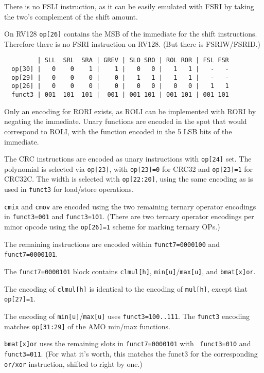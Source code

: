 There is no FSLI instruction, as it can be easily emulated with FSRI by taking the
two's complement of the shift amount.

On RV128 {\tt op[26]} contains the MSB of the immediate for the shift instructions.
Therefore there is no FSRI instruction on RV128. (But there is FSRIW/FSRID.)

\begin{minipage}{\linewidth}
\begin{verbatim}
         | SLL  SRL  SRA | GREV | SLO SRO | ROL ROR | FSL FSR
  op[30] |   0    0    1 |    1 |   0   0 |   1   1 |   -   -
  op[29] |   0    0    0 |    0 |   1   1 |   1   1 |   -   -
  op[26] |   0    0    0 |    0 |   0   0 |   0   0 |   1   1
  funct3 | 001  101  101 |  001 | 001 101 | 001 101 | 001 101
\end{verbatim}
\end{minipage}

Only an encoding for RORI exists, as ROLI can be implemented with RORI by negating
the immediate. Unary functions are encoded in the spot that would correspond to ROLI,
with the function encoded in the 5 LSB bits of the immediate.

The CRC instructions are encoded as unary instructions with {\tt op[24]} set. The
polynomial is selected via {\tt op[23]}, with {\tt op[23]=0} for CRC32 and
{\tt op[23]=1} for CRC32C. The width is selected with {\tt op[22:20]}, using
the same encoding as is used in {\tt funct3} for load/store operations.

{\tt cmix} and {\tt cmov} are encoded using the two remaining ternary operator
encodings in {\tt funct3=001} and {\tt funct3=101}. (There are two ternary
operator encodings per minor opcode using the {\tt op[26]=1} scheme for
marking ternary OPs.)

The remaining instructions are encoded within {\tt funct7=0000100} and
{\tt funct7=0000101}.

The {\tt funct7=0000101} block contains {\tt clmul[h]},
{\tt min[u]}/{\tt max[u]}, and {\tt bmat[x]or}.

The encoding of {\tt clmul[h]} is identical to the encoding of {\tt mul[h]},
except that {\tt op[27]=1}.

The encoding of {\tt min[u]}/{\tt max[u]} uses {\tt funct3=100..111}. The
{\tt funct3} encoding matches {\tt op[31:29]} of the AMO min/max functions.

{\tt bmat[x]or} uses the remaining slots in {\tt funct7=0000101} with {\tt
funct3=010} and {\tt funct3=011}. (For what it's worth, this matches the funct3
for the corresponding {\tt or/xor} instruction, shifted to right by one.)

